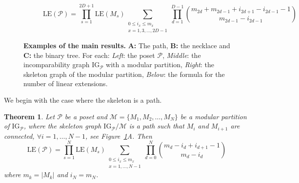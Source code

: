 \documentclass[9pt,a4paper,oneside]{article}
\newtheorem{theorem}{Theorem}
\newcommand{\cM}{\mathcal{M}}
\newcommand{\cP}{\mathcal{P}}
\newcommand{\IG}{\mathrm{IG}}
\newcommand{\lex}{\mathrm{LE}}
\begin{document}
\begin{figure}
\begin{subfigure}{0.3\textwidth}
\begin{center}
  \end{center}
\end{subfigure}
\begin{subfigure}{0.3\textwidth}
  \begin{center}
  \end{center}
\end{subfigure}
\begin{subfigure}{\textwidth}
	$$ \lex(\mathcal{P})=\prod_{s=1}^{2D+1}
 \lex(M_s) \sum_{\substack{0\le i_x\le m_x\\x=1,3,\ldots, 2D-1}}
	\prod_{d=1}^{D-1} \binom{m_{2d}+m_{2d-1}+i_{2d+1}-i_{2d-1}-1}{m_{2d-1}-i_{2d-1}} $$
\end{subfigure}
\caption{
\textbf{Examples of the 
main results.} \textbf{A:} The path, \textbf{B:} the necklace and \textbf{C:} the binary tree. For each: \emph{Left}: the poset $\cP$, \emph{Middle}: the incomparability graph $\IG_\cP$ with a modular partition, \emph{Right}: the skeleton graph of the modular partition, \emph{Below}: the formula for the number of linear extensions.}
\label{fig:main_results}
\end{figure}



We begin with the case where the skeleton is a path. 
 \begin{theorem}\label{thm:path}
Let $\cP$ be a poset and $\cM=\{M_1,M_2,\ldots,M_{N}\}$ be a modular partition of $\IG_\cP$, where 
the skeleton graph $\IG_\cP/\cM$ is a path such that $M_i$ and $M_{i+1}$ are connected, $\forall i=1,\ldots,N-1$, see Figure~\ref{fig:main_results}A. Then
  	$$\lex(\mathcal{P})= \prod_{s=1}^N \lex(M_s) \sum_{\substack{0\le i_x\le m_{x}\\ x=1,\ldots,N-1}} \prod_{d=0}^{N} \binom{m_d - i_d + i_{d+1} - 1}{m_d - i_d}$$
  	where $m_k=|M_k|$ and $i_{N}=m_{N}$.
 \end{theorem}
\end{document}
